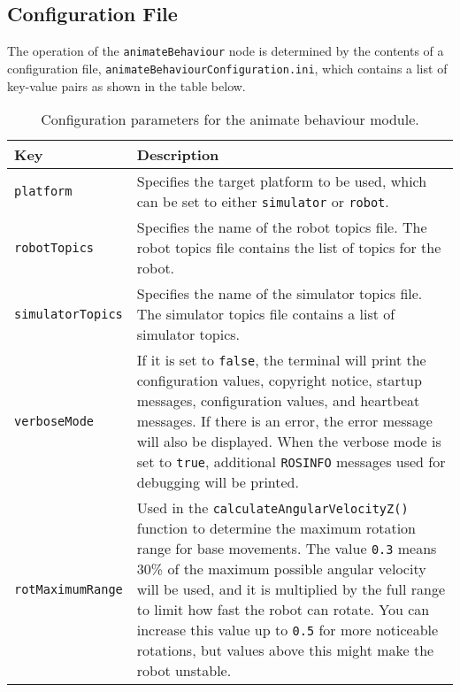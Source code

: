 \documentclass{CSSRforAfrica}
\begin{document}
\subsection*{Configuration File}
\label{sec:configuration file}
The operation of the \texttt{animateBehaviour} node is determined by the contents of a configuration file, \texttt{animateBehaviourConfiguration.ini}, which contains a list of key-value pairs as shown in the table below.
\begin{longtable}{|>{\raggedright\arraybackslash}p{}|>{\raggedright\arraybackslash}p{}|}
    \caption{Configuration parameters for the animate behaviour module.} 
    \label{tab:config_params} \\
    \hline
    \rowcolor{gray!30}
    \textbf{Key} & \textbf{Description} \\ \hline
    \endhead %
    
    \texttt{platform} & Specifies the target platform to be used, which can be set to either \texttt{simulator} or \texttt{robot}. \\ \hline
    
    \texttt{robotTopics} & Specifies the name of the robot topics file. The robot topics file contains the list of topics for the robot. \\ \hline
    
    \texttt{simulatorTopics} & Specifies the name of the simulator topics file. The simulator topics file contains a list of simulator topics. \\ \hline

    \texttt{verboseMode} & If it is set to \texttt{false}, the terminal will print the configuration values, copyright notice, startup messages, configuration values, and heartbeat messages. If there is an error, the error message will also be displayed. When the verbose mode is set to \texttt{true}, additional \texttt{ROSINFO} messages used for debugging will be printed.\\ \hline
    
    \texttt{rotMaximumRange} & Used in the \texttt{calculateAngularVelocityZ()} function to determine the maximum rotation range for base movements. The value \texttt{0.3} means 30\% of the maximum possible angular velocity will be used, and it is multiplied by the full range to limit how fast the robot can rotate. You can increase this value up to \texttt{0.5} for more noticeable rotations, but values above this might make the robot unstable.
    \\ \hline
    

\end{longtable}
\end{document}
